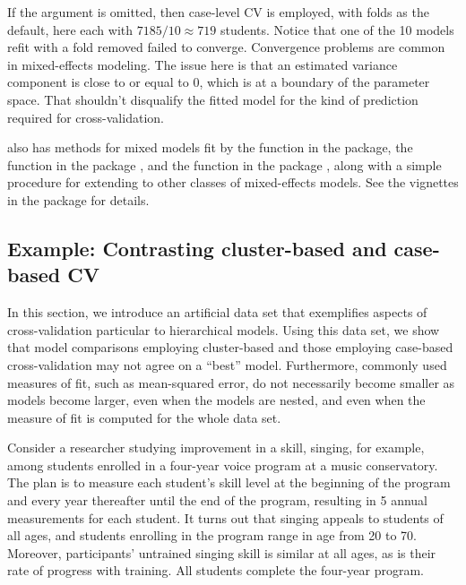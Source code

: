 \documentclass[
]{jss}
\begin{document}
If the  argument is omitted, then case-level CV
is employed, with  folds as the default, here each with
\(7185/10 \approx 719\) students. Notice that one of the 10 models refit
with a fold removed failed to converge. Convergence problems are common
in mixed-effects modeling. The issue here is that an estimated variance
component is close to or equal to 0, which is at a boundary of the
parameter space. That shouldn't disqualify the fitted model for the kind
of prediction required for cross-validation.

 also has methods for mixed models fit by the 
function in the  package, the  function in the
 package \citep{PinheiroBates:2000}, and the 
function in the  package \citep{BrooksEtAl}, along with a
simple procedure for extending  to other classes of
mixed-effects models. See the vignettes in the  package for
details.

\subsection{Example: Contrasting cluster-based and case-based
CV}\label{example-contrasting-cluster-based-and-case-based-cv}

In this section, we introduce an artificial data set that exemplifies
aspects of cross-validation particular to hierarchical models. Using
this data set, we show that model comparisons employing cluster-based
and those employing case-based cross-validation may not agree on a
``best'' model. Furthermore, commonly used measures of fit, such as
mean-squared error, do not necessarily become smaller as models become
larger, even when the models are nested, and even when the measure of
fit is computed for the whole data set.

Consider a researcher studying improvement in a skill, singing, for
example, among students enrolled in a four-year voice program at a music
conservatory. The plan is to measure each student's skill level at the
beginning of the program and every year thereafter until the end of the
program, resulting in 5 annual measurements for each student. It turns
out that singing appeals to students of all ages, and students enrolling
in the program range in age from 20 to 70. Moreover, participants'
untrained singing skill is similar at all ages, as is their rate of
progress with training. All students complete the four-year program.
\end{document}
